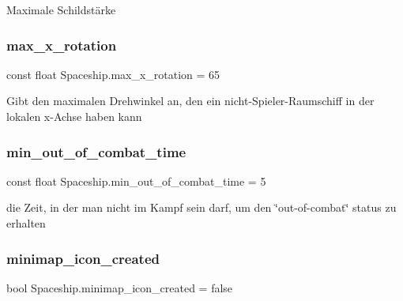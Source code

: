 Maximale Schildstärke 

\mbox{\label{class_spaceship_a44d9e635e6d659a4de6808bb36770ea5}} 
\subsubsection{\texorpdfstring{max\+\_\+x\+\_\+rotation}{max\_x\_rotation}}
{\footnotesize\ttfamily const float Spaceship.\+max\+\_\+x\+\_\+rotation = 65}



Gibt den maximalen Drehwinkel an, den ein nicht-\/\+Spieler-\/\+Raumschiff in der lokalen x-\/\+Achse haben kann 

\mbox{\label{class_spaceship_a862815bd4b04d532e2894ced48d2acc6}} 
\subsubsection{\texorpdfstring{min\+\_\+out\+\_\+of\+\_\+combat\+\_\+time}{min\_out\_of\_combat\_time}}
{\footnotesize\ttfamily const float Spaceship.\+min\+\_\+out\+\_\+of\+\_\+combat\+\_\+time = 5}



die Zeit, in der man nicht im Kampf sein darf, um den \char`\"{}out-\/of-\/combat\char`\"{} status zu erhalten 

\mbox{\label{class_spaceship_ab3545f7f8a0bc4e106c58ee829a8c195}} 
\subsubsection{\texorpdfstring{minimap\+\_\+icon\+\_\+created}{minimap\_icon\_created}}
{\footnotesize\ttfamily bool Spaceship.\+minimap\+\_\+icon\+\_\+created = false}



